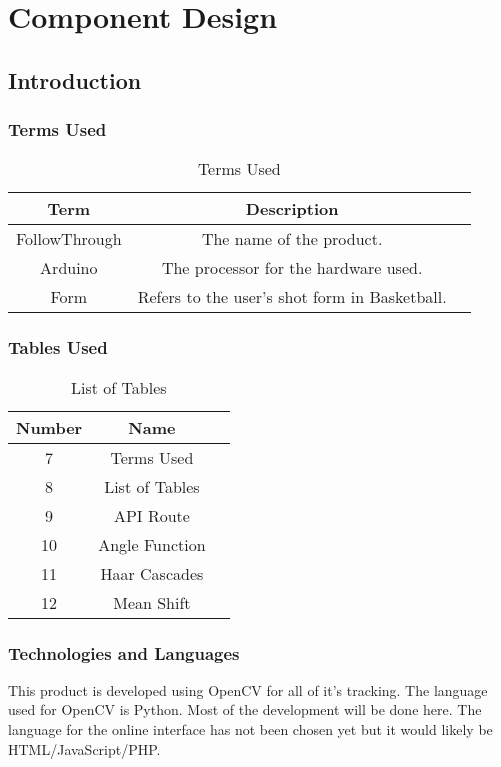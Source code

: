 \chapter{Component Design}

\section{Introduction}

\subsection{Terms Used}
\begin{table}[h!]
  \centering
  \caption{Terms Used}
  \label{tab:table7}
  \begin{tabular}{ccc}
    \toprule
    Term & Description\\
    \midrule
    FollowThrough & The name of the product.\\
    Arduino & The processor for the hardware used.\\
    Form & Refers to the user's shot form in Basketball.\\
    \bottomrule
  \end{tabular}
\end{table}

\subsection{Tables Used}
\begin{table}[h!]
  \centering
  \caption{List of Tables}
  \label{tab:table8}
  \begin{tabular}{ccc}
    \toprule
    Number & Name\\
    \midrule
    7 & Terms Used\\
    8 & List of Tables\\
    9 & API Route\\
    10 & Angle Function\\
    11 & Haar Cascades\\
    12 & Mean Shift\\
    \bottomrule
  \end{tabular}
\end{table}

\subsection{Technologies and Languages}
This product is developed using OpenCV for all of it's tracking. The language used for OpenCV is Python. Most of the development will be done here. The language for the online interface has not been chosen yet but it would likely be HTML/JavaScript/PHP.

